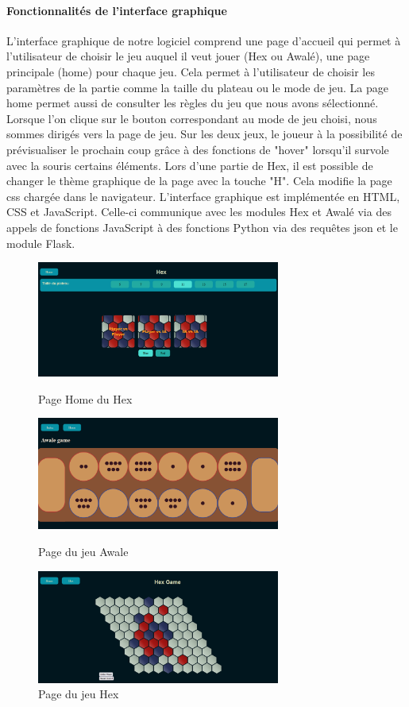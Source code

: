 \paragraph{Fonctionnalités de l'interface graphique}
L'interface graphique de notre logiciel comprend une page d'accueil qui permet à l'utilisateur
de choisir le jeu auquel il veut jouer (Hex ou Awalé), une page principale (home) pour chaque jeu.
Cela permet à l'utilisateur de choisir les paramètres de la partie comme la taille du plateau ou le 
mode de jeu. La page home permet aussi de consulter les règles du jeu que nous avons sélectionné.
Lorsque l'on clique sur le bouton correspondant au mode de jeu choisi, nous sommes dirigés vers la page de
jeu.
Sur les deux jeux, le joueur à la possibilité de prévisualiser le prochain coup grâce à des fonctions de "hover" lorsqu'il survole avec 
la souris certains éléments.
Lors d'une partie de Hex, il est possible de changer le thème graphique de la page avec la touche "H". Cela modifie la page css chargée dans le navigateur.
L'interface graphique est implémentée en HTML, CSS et JavaScript. Celle-ci communique avec les modules Hex et Awalé via des appels de fonctions JavaScript à des
fonctions Python via des requêtes json et le module Flask.

\begin{figure}[h]
    \centering
    \includegraphics[width=8cm]{root/exemple_home.png}
    \caption{Page Home du Hex}
    \label{fig:exemple_home.png}

    \includegraphics[width=8cm]{root/awale_board.png}
    \caption{Page du jeu Awale}
    \label{fig:awale_board.png}

    \includegraphics[width=8cm]{root/exemple_partie_hex.png}
    \caption{Page du jeu Hex}
    \label{fig:exemple_partie_hex.png}
\end{figure}

